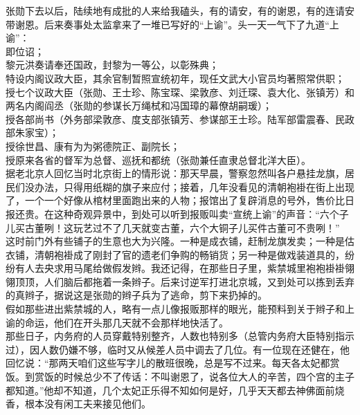 张勋下去以后，陆续地有成批的人来给我磕头，有的请安，有的谢恩，有的连请安带谢恩。后来奏事处太监拿来了一堆已写好的“上谕”。头一天一气下了九道“上谕”：\\

即位诏；\\

黎元洪奏请奉还国政，封黎为一等公，以彰殊典；\\

特设内阁议政大臣，其余官制暂照宣统初年，现任文武大小官员均著照常供职；\\

授七个议政大臣（张勋、王士珍、陈宝琛、梁敦彦、刘迁琛、袁大化、张镇芳）和两名内阁阎丞（张勋的参谋长万绳栻和冯国璋的幕僚胡嗣瑗）；\\

授各部尚书（外务部梁敦彦、度支部张镇芳、参谋部王士珍。陆军部雷震春、民政部朱家宝）；\\

授徐世昌、康有为为粥德院正、副院长；\\

授原来各省的督军为总督、巡抚和都统（张勋兼任直隶总督北洋大臣）。\\

据老北京人回忆当时北京街上的情形说：那天早晨，警察忽然叫各户悬挂龙旗，居民们没办法，只得用纸糊的旗子来应付；接着，几年没看见的清朝袍褂在街上出现了，一个一个好像从棺材里面跑出来的人物；报馆出了复辟消息的号外，售价比日报还贵。在这种奇观异景中，到处可以听到报贩叫卖“宣统上谕”的声音：“六个子儿买古董咧！这玩艺过不了几天就变古董，六个大铜子儿买件古董可不贵咧！”\\

这时前门外有些铺子的生意也大为兴隆。一种是成衣铺，赶制龙旗发卖；一种是估衣铺，清朝袍褂成了刚封了官的遗老们争购的畅销货；另一种是做戏装道具的，纷纷有人去央求用马尾给做假发辫。我还记得，在那些日子里，紫禁城里袍袍褂褂翎翎顶顶，人们脑后都拖着一条辫子。后来讨逆军打进北京城，又到处可以拣到丢弃的真辫子，据说这是张勋的辫子兵为了逃命，剪下来扔掉的。\\

假如那些进出紫禁城的人，略有一点儿像报贩那样的眼光，能预料到关于辫子和上谕的命运，他们在开头那几天就不会那样地快活了。\\

那些日子，内务府的人员穿戴特别整齐，人数也特别多（总管内务府大臣特别指示过），因人数仍嫌不够，临时又从候差人员中调去了几位。有一位现在还健在，他回忆说：“那两天咱们这些写字儿的散班很晚，总是写不过来。每天各太妃都赏饭。到赏饭的时候总少不了传话：不叫谢恩了，说各位大人的辛苦，四个宫的主子都知道。”他却不知道，几个太妃正乐得不知如何是好，几乎天天都去神佛面前烧香，根本没有闲工夫来接见他们。\\

